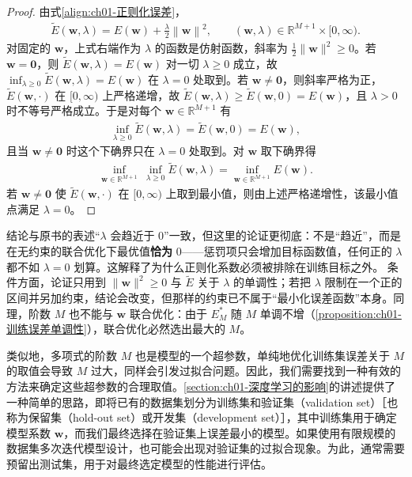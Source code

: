 \documentclass[../../main.tex]{subfiles}
\begin{document}
\begin{proof}
由式\eqref{align:ch01-正则化误差}，
\begin{align*}
 \tilde{E}(\mathbf{w},\lambda)=E(\mathbf{w})+\frac{\lambda}{2}\left\|\mathbf{w}\right\|^{2},
 \qquad (\mathbf{w},\lambda)\in\mathbb{R}^{M+1}\times[0,\infty).
\end{align*}
对固定的 $\mathbf{w}$，上式右端作为 $\lambda$ 的函数是仿射函数，斜率为 $\frac{1}{2}\|\mathbf{w}\|^{2}\geqslant0$。若 $\mathbf{w}=\mathbf{0}$，则 $\tilde{E}(\mathbf{w},\lambda)=E(\mathbf{w})$ 对一切 $\lambda\geqslant0$ 成立，故 $\inf_{\lambda\geqslant0}\tilde{E}(\mathbf{w},\lambda)=E(\mathbf{w})$ 在 $\lambda=0$ 处取到。若 $\mathbf{w}\neq\mathbf{0}$，则斜率严格为正，$\tilde{E}(\mathbf{w},\cdot)$ 在 $[0,\infty)$ 上严格递增，故 $\tilde{E}(\mathbf{w},\lambda)\geqslant\tilde{E}(\mathbf{w},0)=E(\mathbf{w})$，且 $\lambda>0$ 时不等号严格成立。于是对每个 $\mathbf{w}\in\mathbb{R}^{M+1}$ 有
\begin{align*}
 \inf_{\lambda\geqslant 0}\tilde{E}(\mathbf{w},\lambda)=\tilde{E}(\mathbf{w},0)=E(\mathbf{w}),
\end{align*}
且当 $\mathbf{w}\neq\mathbf{0}$ 时这个下确界只在 $\lambda=0$ 处取到。对 $\mathbf{w}$ 取下确界得
\begin{align*}
 \inf_{\mathbf{w}\in\mathbb{R}^{M+1}}\ \inf_{\lambda\geqslant 0}\tilde{E}(\mathbf{w},\lambda)
 =\inf_{\mathbf{w}\in\mathbb{R}^{M+1}}E(\mathbf{w}).
\end{align*}
若 $\mathbf{w}\neq\mathbf{0}$ 使 $\tilde{E}(\mathbf{w},\cdot)$ 在 $[0,\infty)$ 上取到最小值，则由上述严格递增性，该最小值点满足 $\lambda=0$。
\end{proof}

\begin{remark}
结论与原书的表述“$\lambda$ 会趋近于 $0$”一致，但这里的论证更彻底：不是“趋近”，而是在无约束的联合优化下最优值\textbf{恰为} $0$——惩罚项只会增加目标函数值，任何正的 $\lambda$ 都不如 $\lambda=0$ 划算。这解释了为什么正则化系数必须被排除在训练目标之外。
条件方面，论证只用到 $\|\mathbf{w}\|^{2}\geqslant 0$ 与 $\tilde{E}$ 关于 $\lambda$ 的单调性；若把 $\lambda$ 限制在一个正的区间并另加约束，结论会改变，但那样的约束已不属于“最小化误差函数”本身。同理，阶数 $M$ 也不能与 $\mathbf{w}$ 联合优化：由于 $E_{M}^{*}$ 随 $M$ 单调不增（\cref{proposition:ch01-训练误差单调性}），联合优化必然选出最大的 $M$。
\end{remark}

类似地，多项式的阶数 $M$ 也是模型的一个超参数，单纯地优化训练集误差关于 $M$ 的取值会导致 $M$ 过大，同样会引发过拟合问题。因此，我们需要找到一种有效的方法来确定这些超参数的合理取值。\cref{section:ch01-深度学习的影响}的讲述提供了一种简单的思路，即将已有的数据集划分为训练集和验证集（validation set）［也称为保留集（hold-out set）或开发集（development set）］，其中训练集用于确定模型系数 $\mathbf{w}$，而我们最终选择在验证集上误差最小的模型。如果使用有限规模的数据集多次迭代模型设计，也可能会出现对验证集的过拟合现象。为此，通常需要预留出测试集，用于对最终选定模型的性能进行评估。
\end{document}
